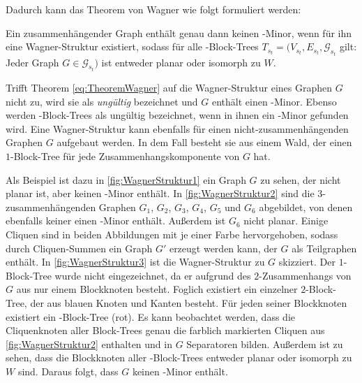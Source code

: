 Dadurch kann das Theorem von Wagner wie folgt formuliert werden:

\begin{theorem}\label{eq:TheoremWagner}
  Ein zusammenhängender Graph enthält genau dann keinen \kf-Minor, wenn für ihn eine Wagner-Struktur existiert, sodass für alle \dd-Block-Trees $T_{s_t} = (V_{s_t}, E_{s_t}, \mathcal{G}_{s_t}$ gilt: Jeder Graph $G \in \mathcal{G}_{s_t})$ ist entweder planar oder isomorph zu $W$.
\end{theorem}

Trifft Theorem \ref{eq:TheoremWagner} auf die Wagner-Struktur eines Graphen $G$ nicht zu, wird sie als \emph{ungültig} bezeichnet und $G$ enthält einen \kf-Minor.
Ebenso werden \dd-Block-Trees als ungültig bezeichnet, wenn in ihnen ein \kf-Minor gefunden wird.
Eine Wagner-Struktur kann ebenfalls für einen nicht-zusammenhängenden Graphen $G$ aufgebaut werden.
In dem Fall besteht sie aus einem Wald, der einen $1$-Block-Tree für jede Zusammenhangskomponente von $G$ hat.

Als Beispiel ist dazu in \Abb \ref{fig:WagnerStruktur1} ein Graph $G$ zu sehen, der nicht planar ist, aber keinen \kf-Minor enthält.
In \Abb \ref{fig:WagnerStruktur2} sind die $3$-zusammenhängenden Graphen $G_1$, $G_2$, $G_3$, $G_4$, $G_5$ und $G_6$ abgebildet, von denen ebenfalls keiner einen \kf-Minor enthält.
Außerdem ist $G_6$ nicht planar.
Einige Cliquen sind in beiden Abbildungen mit je einer Farbe hervorgehoben, sodass durch Cliquen-Summen ein Graph $G'$ erzeugt werden kann, der $G$ als Teilgraphen enthält.
In \Abb \ref{fig:WagnerStruktur3} ist die Wagner-Struktur zu $G$ skizziert.
Der $1$-Block-Tree wurde nicht eingezeichnet, da er aufgrund des $2$-Zusammenhangs von $G$ aus nur einem Blockknoten besteht.
Foglich existiert ein einzelner $2$-Block-Tree, der aus blauen Knoten und Kanten besteht.
Für jeden seiner Blockknoten existiert ein \dd-Block-Tree (rot).
Es kann beobachtet werden, dass die Cliquenknoten aller Block-Trees genau die farblich markierten Cliquen aus \Abb \ref{fig:WagnerStruktur2} enthalten und in $G$ Separatoren bilden.
Außerdem ist zu sehen, dass die Blockknoten aller \dd-Block-Trees entweder planar oder isomorph zu $W$ sind.
Daraus folgt, dass $G$ keinen \kf-Minor enthält.

\newpage

